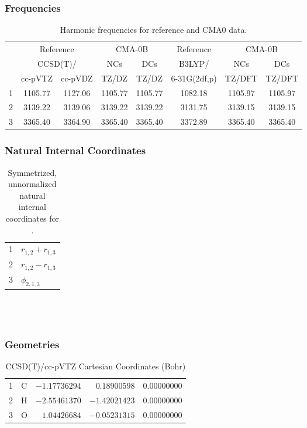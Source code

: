 \documentclass[10pt,oneside]{article}
\begin{document}
\subsubsection*{Frequencies}
\begin{table}[h!]
\centering
\caption{Harmonic frequencies for reference and CMA0 data.}
\begin{tabular}{cccccccc}
\toprule
{} & \multicolumn{2}{c}{Reference} & \multicolumn{2}{c}{CMA-0B} &    Reference & \multicolumn{2}{c}{CMA-0B} \\
{} & \multicolumn{2}{c}{CCSD(T)/} &     NCs &     DCs &       B3LYP/ &     NCs &     DCs \\
{} &   cc-pVTZ & cc-pVDZ &   TZ/DZ &   TZ/DZ & 6-31G(2df,p) &  TZ/DFT &  TZ/DFT \\
\midrule
1 &   1105.77 & 1127.06 & 1105.77 & 1105.77 &      1082.18 & 1105.97 & 1105.97 \\
2 &   3139.22 & 3139.06 & 3139.22 & 3139.22 &      3131.75 & 3139.15 & 3139.15 \\
3 &   3365.40 & 3364.90 & 3365.40 & 3365.40 &      3372.89 & 3365.40 & 3365.40 \\
\bottomrule
\end{tabular}
\end{table}

\clearpage

\subsubsection*{Natural Internal Coordinates}
\begin{table}[h!]
\centering
\caption{Symmetrized, unnormalized natural internal coordinates for .}
\small
\begin{tabular}{ll}
  1   & $r_{1,2} + r_{1,3}$ \\
  2   & $r_{1,2} - r_{1,3}$ \\
  3   & $\phi_{2,1,3}$ \\
\end{tabular}
\end{table}

\clearpage

\subsection{\ \ \ }

\subsubsection*{Geometries}
\begin{table}[h!]
\centering
\caption{CCSD(T)/cc-pVTZ Cartesian Coordinates (Bohr)}
\begin{tabular}{llrrr}
1  & C  & $-1.17736294$ & $ 0.18900598$ & $ 0.00000000$ \\
2  & H  & $-2.55461370$ & $-1.42021423$ & $ 0.00000000$ \\
3  & O  & $ 1.04426684$ & $-0.05231315$ & $ 0.00000000$ \\
\end{tabular}
\end{table}
\end{document}
